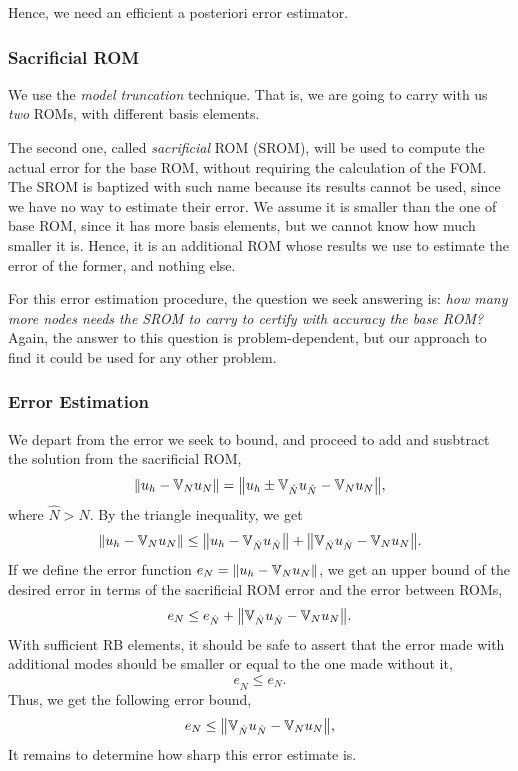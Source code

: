 \documentclass[../../thesis.tex]{subfiles}
\newcommand{\rbV}{\ensuremath{\mathbb{V}}}
\begin{document}
Hence, we need an efficient a posteriori error estimator.

\subsubsection{Sacrificial ROM}
We use the \textit{model truncation} technique.
That is, we are going to carry with us \textit{two} ROMs,
with different basis elements.

The second one, called \textit{sacrificial} ROM (SROM),
will be used to compute the actual error for the base ROM,
without requiring the calculation of the FOM.
The SROM is baptized with such name because its results cannot be used,
since we have no way to estimate their error.
We assume it is smaller than the one of base ROM, since it has more basis elements,
but we cannot know how much smaller it is.
Hence, it is an additional ROM whose results we use to estimate the error of the former, 
and nothing else.

For this error estimation procedure, the question we seek answering is:
\textit{how many more nodes needs the SROM to carry to certify with accuracy the base ROM?}
Again, the answer to this question is problem-dependent,
but our approach to find it could be used for any other problem.

\subsubsection{Error Estimation}
We depart from the error we seek to bound,
and proceed to add and susbtract the solution from the sacrificial ROM,
\begin{equation}
    \norm{u_h - \rbV_{N} u_N} = \norm{u_h \pm \rbV_{\hat{N}} u_{\hat{N}} - \rbV_{N} u_{N}},
\end{equation}
where $\hat{N} > N$. 
By the triangle inequality, we get
\begin{equation}
    \norm{u_h - \rbV_{N} u_N} \leq \norm{u_h - \rbV_{\hat{N}} u_{\hat{N}}} + \norm{\rbV_{\hat{N}} u_{\hat{N}} - \rbV_{N} u_{N}}.
\end{equation}
If we define the error function $e_N = \norm{u_h - \rbV_{N} u_N}$, 
we get an upper bound of the desired error in terms of the sacrificial ROM error and the error between ROMs,
\begin{equation}
    e_N \leq e_{\hat{N}} + \norm{\rbV_{\hat{N}} u_{\hat{N}} - \rbV_{N} u_{N}}.
\end{equation}
With sufficient RB elements, it should be safe to assert that the error made 
with additional modes should be smaller or equal to the one made without it,
\begin{equation}
    e_{\hat{N}} \leq e_{N}.
\end{equation}
Thus, we get the following error bound,
\begin{equation}
    e_N \leq \norm{\rbV_{\hat{N}} u_{\hat{N}} - \rbV_{N} u_{N}},
\end{equation}
It remains to determine how sharp this error estimate is.
\end{document}
